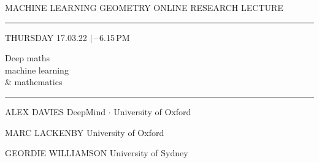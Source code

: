 \documentclass[aspectratio=169,11pt]{beamer}
\newcommand{\eyebrow}[1]{%
  {\fontsize{7.8}{9}\selectfont\ttfamily\MakeUppercase{#1}}%
}
\begin{document}
\begin{frame}[plain]
\vspace*{0.20cm}
\hspace*{0.22cm}
\begin{minipage}{.48\paperwidth}
  \eyebrow{Machine Learning Geometry \enspace\textbullet\enspace Online Research Lecture}\par
  \vspace{.28cm}
  {\color{amberLight}\rule{1.10cm}{0.42pt}}\par
  \vspace{.20cm}
  \eyebrow{Thursday 17.03.22 \enspace$\mid$\,--\,6.15\,pm}\par
  \vspace{.60cm}
  {\fontsize{30}{34}\selectfont\color{crimson} Deep maths}\\[-.06em]
  {\fontsize{30}{34}\selectfont machine learning}\\[-.06em]
  {\fontsize{30}{34}\selectfont \& mathematics}\par
  \vspace{.44cm}
  {\color{amber!40}\rule{\linewidth}{0.36pt}}\par
  \vspace{.28cm}
  {\color{deepcrimson}\eyebrow{Alex Davies}}\hspace{.22cm}%
  {\fontsize{8}{10}\selectfont DeepMind $\cdot$ University of Oxford}\par
  \vspace{.10cm}
  {\color{deepcrimson}\eyebrow{Marc Lackenby}}\hspace{.20cm}%
  {\fontsize{8}{10}\selectfont University of Oxford}\par
  \vspace{.10cm}
  {\color{deepcrimson}\eyebrow{Geordie Williamson}}\hspace{.18cm}%
  {\fontsize{8}{10}\selectfont University of Sydney}\par
\end{minipage}
\end{frame}
\end{document}
